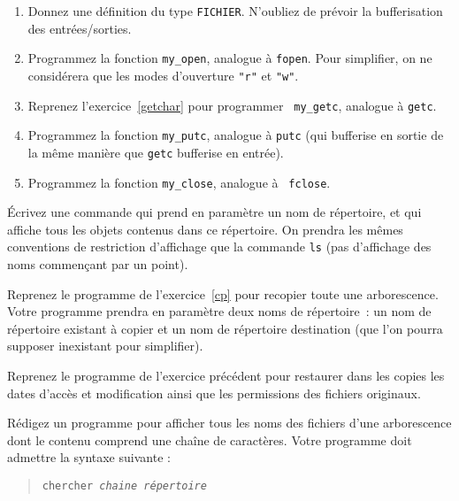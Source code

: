 \begin {enumerate}
    \item Donnez une définition du type {\tt FICHIER}.  N'oubliez de
	prévoir la bufferisation des entrées/sorties.

    \item Programmez la fonction {\tt my\_open}, analogue à {\tt fopen}.
	Pour simplifier, on ne considérera que les modes d'ouverture
	\verb|"r"| et \verb|"w"|.

    \item Reprenez l'exercice~\ref {getchar} pour programmer {\tt
	my\_getc}, analogue à {\tt getc}.

    \item Programmez la fonction {\tt my\_putc}, analogue à {\tt putc}
	(qui bufferise en sortie de la même manière que \texttt {getc}
	bufferise en entrée).

    \item Programmez la fonction {\tt my\_close}, analogue à {\tt
	fclose}.

\end {enumerate}



\question

Écrivez une commande qui prend en paramètre un nom de répertoire, et
qui affiche tous les objets contenus dans ce répertoire. On prendra les
mêmes conventions de restriction d'affichage que la commande {\tt ls}
(pas d'affichage des noms commençant par un point).


\question

Reprenez le programme de l'exercice~\ref {cp} pour recopier toute
une arborescence. Votre programme prendra en paramètre deux noms
de répertoire~: un nom de répertoire existant à copier et un nom
de répertoire destination (que l'on pourra supposer inexistant pour
simplifier).


\question

Reprenez le programme de l'exercice précédent pour restaurer dans les
copies les dates d'accès et modification ainsi que les permissions des
fichiers originaux.


\question

Rédigez un programme pour afficher tous les noms des fichiers d'une
arborescence dont le contenu comprend une chaîne de caractères. Votre
programme doit admettre la syntaxe suivante :

\begin {quote}
\texttt {chercher \emph {chaine répertoire}}
\end {quote}


